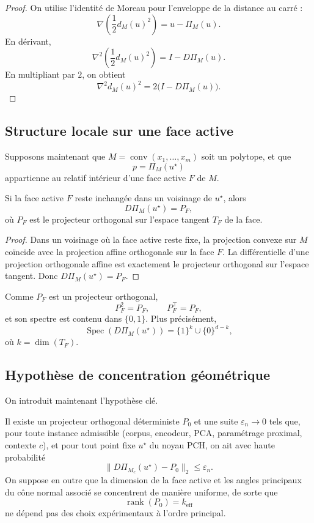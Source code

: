 \begin{proof}
On utilise l'identité de Moreau pour l'enveloppe de la distance au carré :
\[
\nabla\!\left(\frac12 d_M(u)^2\right)=u-\Pi_M(u).
\]
En dérivant,
\[
\nabla^2\!\left(\frac12 d_M(u)^2\right)=I-D\Pi_M(u).
\]
En multipliant par \(2\), on obtient
\[
\nabla^2 d_M(u)^2
=
2\bigl(I-D\Pi_M(u)\bigr).
\]
\end{proof}

\subsection{Structure locale sur une face active}

Supposons maintenant que \(M=\operatorname{conv}(x_1,\dots,x_m)\) soit un polytope, et que
\[
p=\Pi_M(u^\star)
\]
appartienne au relatif intérieur d'une face active \(F\) de \(M\).

\begin{lemma}
Si la face active \(F\) reste inchangée dans un voisinage de \(u^\star\), alors
\[
D\Pi_M(u^\star)=P_F,
\]
où \(P_F\) est le projecteur orthogonal sur l'espace tangent \(T_F\) de la face.
\end{lemma}

\begin{proof}
Dans un voisinage où la face active reste fixe, la projection convexe sur \(M\) coïncide avec la projection affine orthogonale sur la face \(F\).  
La différentielle d'une projection orthogonale affine est exactement le projecteur orthogonal sur l'espace tangent.  
Donc \(D\Pi_M(u^\star)=P_F\).
\end{proof}

\begin{corollary}
Comme \(P_F\) est un projecteur orthogonal,
\[
P_F^2=P_F,\qquad P_F^\top=P_F,
\]
et son spectre est contenu dans \(\{0,1\}\).  
Plus précisément,
\[
\operatorname{Spec}(D\Pi_M(u^\star))
=
\{1\}^{k}\cup\{0\}^{d-k},
\]
où \(k=\dim(T_F)\).
\end{corollary}

\subsection{Hypothèse de concentration géométrique}

On introduit maintenant l'hypothèse clé.

\begin{assumption}
Il existe un projecteur orthogonal déterministe \(P_0\) et une suite \(\varepsilon_n\to 0\) tels que, pour toute instance admissible
(corpus, encodeur, PCA, paramétrage proximal, contexte \(c\)), et pour tout point fixe \(u^\star\) du noyau PCH, on ait avec haute probabilité
\[
\|D\Pi_{M_c}(u^\star)-P_0\|_2\le \varepsilon_n.
\]
On suppose en outre que la dimension de la face active et les angles principaux du cône normal associé se concentrent de manière uniforme, de sorte que
\[
\operatorname{rank}(P_0)=k_{\mathrm{eff}}
\]
ne dépend pas des choix expérimentaux à l'ordre principal.
\end{assumption}

